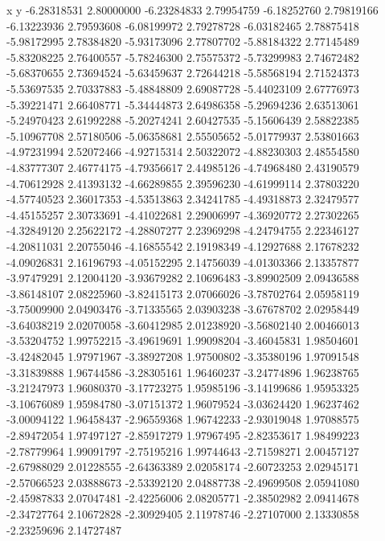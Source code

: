 x y
-6.28318531  2.80000000  
-6.23284833  2.79954759  
-6.18252760  2.79819166  
-6.13223936  2.79593608  
-6.08199972  2.79278728  
-6.03182465  2.78875418  
-5.98172995  2.78384820  
-5.93173096  2.77807702  
-5.88184322  2.77145489  
-5.83208225  2.76400557  
-5.78246300  2.75575372  
-5.73299983  2.74672482  
-5.68370655  2.73694524  
-5.63459637  2.72644218  
-5.58568194  2.71524373  
-5.53697535  2.70337883  
-5.48848809  2.69087728  
-5.44023109  2.67776973  
-5.39221471  2.66408771  
-5.34444873  2.64986358  
-5.29694236  2.63513061  
-5.24970423  2.61992288  
-5.20274241  2.60427535  
-5.15606439  2.58822385  
-5.10967708  2.57180506  
-5.06358681  2.55505652  
-5.01779937  2.53801663  
-4.97231994  2.52072466  
-4.92715314  2.50322072  
-4.88230303  2.48554580  
-4.83777307  2.46774175  
-4.79356617  2.44985126  
-4.74968480  2.43190579  
-4.70612928  2.41393132  
-4.66289855  2.39596230  
-4.61999114  2.37803220  
-4.57740523  2.36017353  
-4.53513863  2.34241785  
-4.49318873  2.32479577  
-4.45155257  2.30733691  
-4.41022681  2.29006997  
-4.36920772  2.27302265  
-4.32849120  2.25622172  
-4.28807277  2.23969298  
-4.24794755  2.22346127  
-4.20811031  2.20755046  
-4.16855542  2.19198349  
-4.12927688  2.17678232  
-4.09026831  2.16196793  
-4.05152295  2.14756039  
-4.01303366  2.13357877  
-3.97479291  2.12004120  
-3.93679282  2.10696483  
-3.89902509  2.09436588  
-3.86148107  2.08225960  
-3.82415173  2.07066026  
-3.78702764  2.05958119  
-3.75009900  2.04903476  
-3.71335565  2.03903238  
-3.67678702  2.02958449  
-3.64038219  2.02070058  
-3.60412985  2.01238920  
-3.56802140  2.00466013  
-3.53204752  1.99752215  
-3.49619691  1.99098204  
-3.46045831  1.98504601  
-3.42482045  1.97971967  
-3.38927208  1.97500802  
-3.35380196  1.97091548  
-3.31839888  1.96744586  
-3.28305161  1.96460237  
-3.24774896  1.96238765  
-3.21247973  1.96080370  
-3.17723275  1.95985196  
-3.14199686  1.95953325  
-3.10676089  1.95984780  
-3.07151372  1.96079524  
-3.03624420  1.96237462  
-3.00094122  1.96458437  
-2.96559368  1.96742233  
-2.93019048  1.97088575  
-2.89472054  1.97497127  
-2.85917279  1.97967495  
-2.82353617  1.98499223  
-2.78779964  1.99091797  
-2.75195216  1.99744643  
-2.71598271  2.00457127  
-2.67988029  2.01228555  
-2.64363389  2.02058174  
-2.60723253  2.02945171  
-2.57066523  2.03888673  
-2.53392120  2.04887738  
-2.49699508  2.05941080  
-2.45987833  2.07047481  
-2.42256006  2.08205771  
-2.38502982  2.09414678  
-2.34727764  2.10672828  
-2.30929405  2.11978746  
-2.27107000  2.13330858  
-2.23259696  2.14727487  
